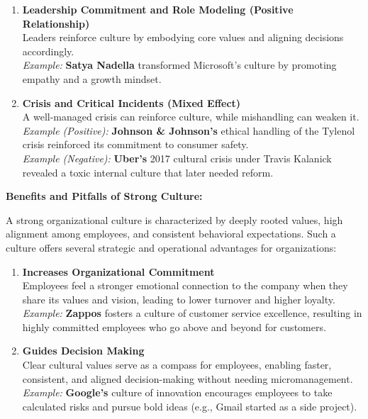 \documentclass[10pt,a4paper]{book}
\begin{document}
\begin{multicols}{2}
\begin{enumerate}
    \item \textbf{Leadership Commitment and Role Modeling (Positive Relationship)} \\
    Leaders reinforce culture by embodying core values and aligning decisions accordingly.\\
    \textit{Example:} \textbf{Satya Nadella} transformed Microsoft’s culture by promoting empathy and a growth mindset.

    \item \textbf{Crisis and Critical Incidents (Mixed Effect)} \\
    A well-managed crisis can reinforce culture, while mishandling can weaken it.\\
    \textit{Example (Positive):} \textbf{Johnson \& Johnson’s} ethical handling of the Tylenol crisis reinforced its commitment to consumer safety.\\
    \textit{Example (Negative):} \textbf{Uber’s} 2017 cultural crisis under Travis Kalanick revealed a toxic internal culture that later needed reform.
\end{enumerate}

\vspace{0.5cm}

\textbf{Benefits and Pitfalls of Strong Culture:}

A strong organizational culture is characterized by deeply rooted values, high alignment among employees, and consistent behavioral expectations. Such a culture offers several strategic and operational advantages for organizations:

\begin{enumerate}
    \item \textbf{Increases Organizational Commitment} \\
    Employees feel a stronger emotional connection to the company when they share its values and vision, leading to lower turnover and higher loyalty.\\
    \textit{Example:} \textbf{Zappos} fosters a culture of customer service excellence, resulting in highly committed employees who go above and beyond for customers.

    \item \textbf{Guides Decision Making} \\
    Clear cultural values serve as a compass for employees, enabling faster, consistent, and aligned decision-making without needing micromanagement.\\
    \textit{Example:} \textbf{Google's} culture of innovation encourages employees to take calculated risks and pursue bold ideas (e.g., Gmail started as a side project).


\end{enumerate}
\end{multicols}
\end{document}
